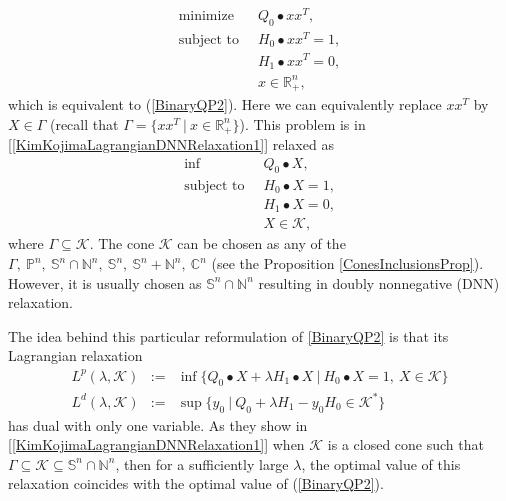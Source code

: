 \documentclass[12pt]{book}
\theoremstyle{definition}
\begin{document}
\begin{equation}
\label{BinaryQOP3}
\begin{array}{ll}
\mbox{minimize } 	& \ Q_0\bullet xx^T, \\
\mbox{subject to } 	& \ H_0\bullet xx^T = 1, \\
			& \ H_1\bullet xx^T = 0, \\
			& \ x\in\mathbb{R}^n_+,
\end{array}
\end{equation}
which is equivalent to (\ref{BinaryQP2}).  Here we can equivalently replace $xx^T$ by $X\in\Gamma$ (recall that $\Gamma = \{ xx^T \ \vert \ x\in\mathbb{R}^n_+ \}$). This problem is in [\ref{KimKojimaLagrangianDNNRelaxation1}] relaxed as 
\begin{equation}
\label{BinaryQOP3Relax}
\begin{array}{ll}
\mbox{inf } 	& \ Q_0\bullet X, \\ %
\mbox{subject to } 	& \ H_0\bullet X = 1, \\
			& \ H_1\bullet X = 0, \\
			& \ X\in\mathcal{K},
\end{array}
\end{equation}
where $\Gamma\subseteq\mathcal{K}$. The cone $\mathcal{K}$ can be chosen as any of the 
 $\Gamma, \ \mathbb{P}^n ,\ \mathbb{S}^n \cap \mathbb{N}^n , \ \mathbb{S}^n , \ \mathbb{S}^n + \mathbb{N}^n , \ \mathbb{C}^n $ (see the Proposition \ref{ConesInclusionsProp}). However, it is usually chosen as $\mathbb{S}^n \cap \mathbb{N}^n$ resulting in doubly nonnegative (DNN) relaxation.

The idea behind this particular reformulation of \ref{BinaryQP2} is that its Lagrangian relaxation 
\begin{eqnarray}
\label{LagrangianDNNPrimalDualPair1}
L^p(\lambda, \mathcal{K}) &:=& \inf \{ Q_0\bullet X + \lambda H_1\bullet X\ \vert \ H_0\bullet X = 1, \ X\in \mathcal{K} \} \\
\label{LagrangianDNNPrimalDualPair2}
L^d(\lambda, \mathcal{K}) &:=& \sup \{ y_0\ \vert \  Q_0 + \lambda H_1 - y_0H_0  \in \mathcal{K}^* \}
\end{eqnarray}
has dual with only one variable. 
As they show in [\ref{KimKojimaLagrangianDNNRelaxation1}] when $\mathcal{K}$ is a closed cone such that $\Gamma \subseteq \mathcal{K} \subseteq \mathbb{S}^n \cap \mathbb{N}^n$, then for a sufficiently large $\lambda$, the optimal value of this relaxation coincides with the optimal value of (\ref{BinaryQP2}).
\end{document}
